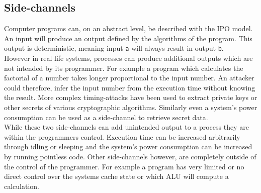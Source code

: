 \documentclass[conference,compsoc,final,a4paper]{IEEEtran}
\begin{document}
\subsection{Side-channels}
Computer programs can, on an abstract level, be described with the \ac{IPO} model. An input will produce an output defined by the algorithms of the program. This output is deterministic, meaning input \lstinline|a| will always result in output \lstinline|b|. \\
However in real life systems, processes can produce additional outputs which are not intended by its programmer. For example a program which calculates the factorial of a number takes longer proportional to the input number. An attacker could therefore, infer the input number from the execution time without knowing the result. More complex timing-attacks have been used to extract private keys or other secrets of various cryptographic algorithms. \cite{bernstein2005cache}\cite{kocher1996timing} Similarly even a system's power consumption can be used as a side-channel to retrieve secret data. \cite{kocher1999differential} \\
While these two side-channels can add unintended output to a process they are within the programmers control. Execution time can be increased arbitrarily through idling or sleeping and the system's power consumption can be increased by running pointless code. Other side-channels however, are completely outside of the control of the programmer. For example a program has very limited or no direct control over the systems cache state or which \ac{ALU} will compute a calculation. \cite{kocher2018spectre}
\end{document}
